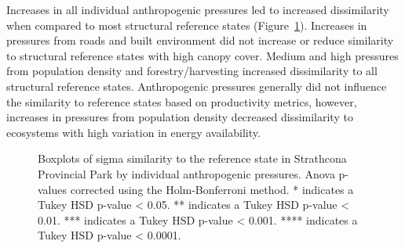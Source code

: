 \documentclass[
]{agujournal2019}
\begin{document}
Increases in all individual anthropogenic pressures led to increased
dissimilarity when compared to most structural reference states
(Figure~\ref{fig-boxplot-individual}). Increases in pressures from roads
and built environment did not increase or reduce similarity to
structural reference states with high canopy cover. Medium and high
pressures from population density and forestry/harvesting increased
dissimilarity to all structural reference states. Anthropogenic
pressures generally did not influence the similarity to reference states
based on productivity metrics, however, increases in pressures from
population density decreased dissimilarity to ecosystems with high
variation in energy availability.

\label{cell-fig-boxplot-individual}
\begin{figure}[H]


\caption{\label{fig-boxplot-individual}Boxplots of sigma similarity to
the reference state in Strathcona Provincial Park by individual
anthropogenic pressures. Anova p-values corrected using the
Holm-Bonferroni method. * indicates a Tukey HSD p-value \textless{}
0.05. ** indicates a Tukey HSD p-value \textless{} 0.01. *** indicates a
Tukey HSD p-value \textless{} 0.001. **** indicates a Tukey HSD p-value
\textless{} 0.0001.}

\end{figure}%
\end{document}
